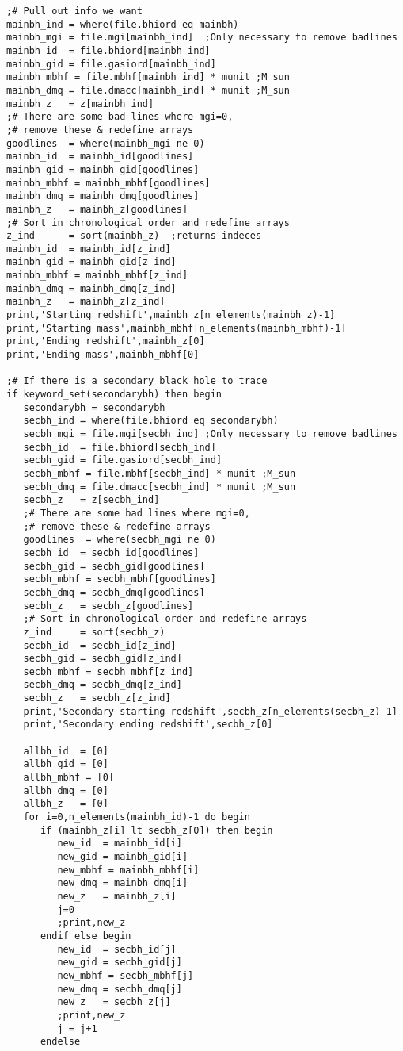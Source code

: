 \documentclass[12pt,headA,chapB]{fiskthesis}
\begin{document}
\begin{verbatim}
;# Pull out info we want
mainbh_ind = where(file.bhiord eq mainbh)
mainbh_mgi = file.mgi[mainbh_ind]  ;Only necessary to remove badlines   
mainbh_id  = file.bhiord[mainbh_ind]
mainbh_gid = file.gasiord[mainbh_ind]
mainbh_mbhf = file.mbhf[mainbh_ind] * munit ;M_sun
mainbh_dmq = file.dmacc[mainbh_ind] * munit ;M_sun
mainbh_z   = z[mainbh_ind]
;# There are some bad lines where mgi=0, 
;# remove these & redefine arrays
goodlines  = where(mainbh_mgi ne 0)
mainbh_id  = mainbh_id[goodlines]
mainbh_gid = mainbh_gid[goodlines]
mainbh_mbhf = mainbh_mbhf[goodlines]
mainbh_dmq = mainbh_dmq[goodlines]
mainbh_z   = mainbh_z[goodlines]
;# Sort in chronological order and redefine arrays
z_ind      = sort(mainbh_z)  ;returns indeces
mainbh_id  = mainbh_id[z_ind]
mainbh_gid = mainbh_gid[z_ind]
mainbh_mbhf = mainbh_mbhf[z_ind] 
mainbh_dmq = mainbh_dmq[z_ind]
mainbh_z   = mainbh_z[z_ind]
print,'Starting redshift',mainbh_z[n_elements(mainbh_z)-1]
print,'Starting mass',mainbh_mbhf[n_elements(mainbh_mbhf)-1]
print,'Ending redshift',mainbh_z[0]
print,'Ending mass',mainbh_mbhf[0]

;# If there is a secondary black hole to trace
if keyword_set(secondarybh) then begin
   secondarybh = secondarybh
   secbh_ind = where(file.bhiord eq secondarybh)
   secbh_mgi = file.mgi[secbh_ind] ;Only necessary to remove badlines
   secbh_id  = file.bhiord[secbh_ind]
   secbh_gid = file.gasiord[secbh_ind]
   secbh_mbhf = file.mbhf[secbh_ind] * munit ;M_sun
   secbh_dmq = file.dmacc[secbh_ind] * munit ;M_sun
   secbh_z   = z[secbh_ind]
   ;# There are some bad lines where mgi=0, 
   ;# remove these & redefine arrays
   goodlines  = where(secbh_mgi ne 0)
   secbh_id  = secbh_id[goodlines]
   secbh_gid = secbh_gid[goodlines]
   secbh_mbhf = secbh_mbhf[goodlines]
   secbh_dmq = secbh_dmq[goodlines]
   secbh_z   = secbh_z[goodlines]
   ;# Sort in chronological order and redefine arrays
   z_ind     = sort(secbh_z)
   secbh_id  = secbh_id[z_ind]
   secbh_gid = secbh_gid[z_ind]
   secbh_mbhf = secbh_mbhf[z_ind]
   secbh_dmq = secbh_dmq[z_ind]
   secbh_z   = secbh_z[z_ind]
   print,'Secondary starting redshift',secbh_z[n_elements(secbh_z)-1]
   print,'Secondary ending redshift',secbh_z[0]
   
   allbh_id  = [0]
   allbh_gid = [0]
   allbh_mbhf = [0]
   allbh_dmq = [0]
   allbh_z   = [0]
   for i=0,n_elements(mainbh_id)-1 do begin
      if (mainbh_z[i] lt secbh_z[0]) then begin
         new_id  = mainbh_id[i]
         new_gid = mainbh_gid[i]
         new_mbhf = mainbh_mbhf[i]
         new_dmq = mainbh_dmq[i]
         new_z   = mainbh_z[i]
         j=0
         ;print,new_z
      endif else begin
         new_id  = secbh_id[j]
         new_gid = secbh_gid[j]
         new_mbhf = secbh_mbhf[j]
         new_dmq = secbh_dmq[j]
         new_z   = secbh_z[j]
         ;print,new_z
         j = j+1
      endelse
      

\end{verbatim}
\end{document}
